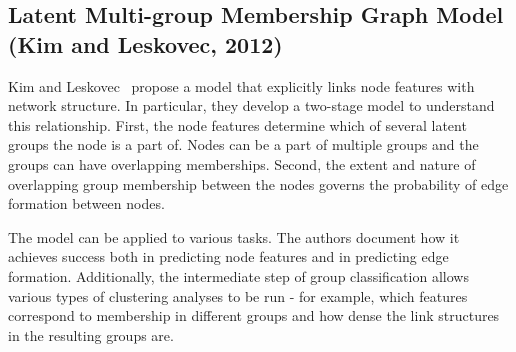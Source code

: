 \subsection{Latent Multi-group Membership Graph Model (Kim and Leskovec, 2012)}

Kim and Leskovec~\cite{Kim} propose a model that explicitly links node features
with network structure. In particular, they develop a two-stage model to
understand this relationship. First, the node features determine which of
several latent groups the node is a part of. Nodes can be a part of multiple
groups and the groups can have overlapping memberships. Second, the extent and
nature of overlapping group membership between the nodes governs the probability
of edge formation between nodes.

The model can be applied to various tasks. The authors document how it achieves
success both in predicting node features and in predicting edge formation.
Additionally, the intermediate step of group classification allows various types
of clustering analyses to be run - for example, which features correspond to
membership in different groups and how dense the link structures in the
resulting groups are.
